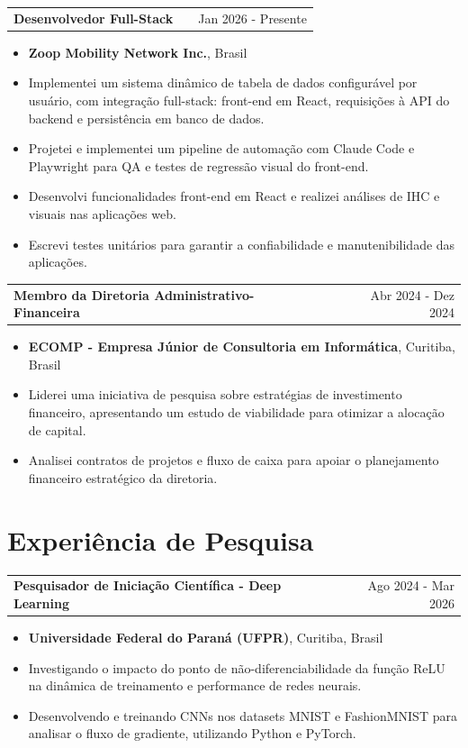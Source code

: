\documentclass[a4paper,12pt]{article}
\makeatletter
\newenvironment{joblong}[2]
    {
    \begin{tabularx}{\linewidth}{@{}l X r@{}}
    \textbf{#1} & \hfill &  #2 \\[3.75pt]
    \end{tabularx}
    \begin{minipage}[t]{\linewidth}
    \begin{itemize}[nosep,after=\strut, leftmargin=1em, itemsep=3pt,label=--]
    }
    {
    \end{itemize}
    \end{minipage}    
    }
\makeatother
\begin{document}
\begin{joblong}{Desenvolvedor Full-Stack}{Jan 2026 - Presente}
\item \textbf{Zoop Mobility Network Inc.}, Brasil
\item Implementei um sistema dinâmico de tabela de dados configurável por usuário, com integração full-stack: front-end em React, requisições à API do backend e persistência em banco de dados.
\item Projetei e implementei um pipeline de automação com Claude Code e Playwright para QA e testes de regressão visual do front-end.
\item Desenvolvi funcionalidades front-end em React e realizei análises de IHC e visuais nas aplicações web.
\item Escrevi testes unitários para garantir a confiabilidade e manutenibilidade das aplicações.
\end{joblong}

\begin{joblong}{Membro da Diretoria Administrativo-Financeira}{Abr 2024 - Dez 2024}
\item \textbf{ECOMP - Empresa Júnior de Consultoria em Informática}, Curitiba, Brasil
\item Liderei uma iniciativa de pesquisa sobre estratégias de investimento financeiro, apresentando um estudo de viabilidade para otimizar a alocação de capital.
\item Analisei contratos de projetos e fluxo de caixa para apoiar o planejamento financeiro estratégico da diretoria.
\end{joblong}

\section{Experiência de Pesquisa}

\begin{joblong}{Pesquisador de Iniciação Científica - Deep Learning}{Ago 2024 - Mar 2026}
\item \textbf{Universidade Federal do Paraná (UFPR)}, Curitiba, Brasil
\item Investigando o impacto do ponto de não-diferenciabilidade da função ReLU na dinâmica de treinamento e performance de redes neurais.
\item Desenvolvendo e treinando CNNs nos datasets MNIST e FashionMNIST para analisar o fluxo de gradiente, utilizando Python e PyTorch.
\end{joblong}
\end{document}
